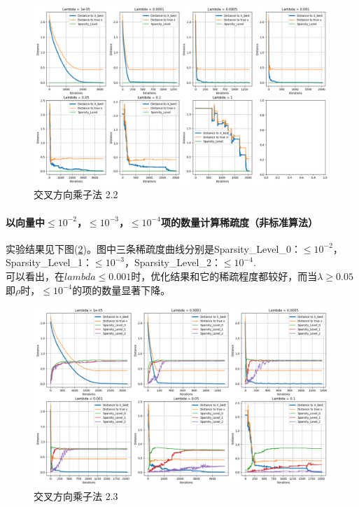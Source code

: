 \documentclass{article}
\begin{document}
\begin{figure}[H]
    \centering
    \includegraphics[width=0.9\linewidth]{./images/Figure_2_2.png}
    \caption{交叉方向乘子法 2.2}
    \label{fig: img2.2}
\end{figure}

\paragraph{以向量中$\leq 10^{-2}$，$\leq 10^{-3}$，$\leq 10^{-4}$项的数量计算稀疏度（非标准算法）\\}
实验结果见下图(\ref{fig: img2.3})。图中三条稀疏度曲线分别是Sparsity\_Level\_0：$\leq 10^{-2}$，
Sparsity\_Level\_1：$\leq 10^{-3}$，Sparsity\_Level\_2：$\leq 10^{-4}$.\\
可以看出，在$lambda\leq 0.001$时，优化结果和它的稀疏程度都较好，而当$\lambda\geq 0.05$即$\rho$时，$\leq 10^{-4}$的项的数量显著下降。
\begin{figure}[H]
    \centering
    \includegraphics[width=0.9\linewidth]{./images/Figure_2_3.png}
    \caption{交叉方向乘子法 2.3}
    \label{fig: img2.3}
\end{figure}
\end{document}
